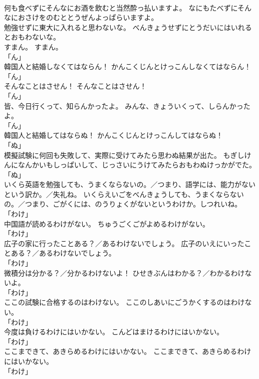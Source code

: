 \documentclass[8pt]{extreport}
\begin{document}
\begin{CJK}{UTF8}{min}
\\	何も食べずにそんなにお酒を飲むと当然酔っ払いますよ。	なにもたべずにそんなにおさけをのむととうぜんよっぱらいますよ。	
\\	勉強せずに東大に入れると思わないな。	べんきょうせずにとうだいにはいれるとおもわないな。	
\\	すまん。	すまん。	
\\	「ん」	
\\	韓国人と結婚しなくてはならん！	かんこくじんとけっこんしなくてはならん！	
\\	「ん」	
\\	そんなことはさせん！	そんなことはさせん！	
\\	「ん」	
\\	皆、今日行くって、知らんかったよ。	みんな、きょういくって、しらんかったよ。	
\\	「ん」	
\\	韓国人と結婚してはならぬ！	かんこくじんとけっこんしてはならぬ！	
\\	「ぬ」	
\\	模擬試験に何回も失敗して、実際に受けてみたら思わぬ結果が出た。	もぎしけんになんかいもしっぱいして、じっさいにうけてみたらおもわぬけっかがでた。	
\\	「ぬ」	
\\	いくら英語を勉強しても、うまくならないの。／つまり、語学には、能力がないという訳か。／失礼ね。	いくらえいごをべんきょうしても、うまくならないの。／つまり、ごがくには、のうりょくがないというわけか。しつれいね。	
\\	「わけ」	
\\	中国語が読めるわけがない。	ちゅうごくごがよめるわけがない。	
\\	「わけ」	
\\	広子の家に行ったことある？／あるわけないでしょう。	広子のいえにいったことある？／あるわけないでしょう。	
\\	「わけ」	
\\	微積分は分かる？／分かるわけないよ！	ひせきぶんはわかる？／わかるわけないよ。	
\\	「わけ」	
\\	ここの試験に合格するのはわけない。	ここのしあいにごうかくするのはわけない。	
\\	「わけ」	
\\	今度は負けるわけにはいかない。	こんどはまけるわけにはいかない。	
\\	「わけ」	
\\	ここまできて、あきらめるわけにはいかない。	ここまできて、あきらめるわけにはいかない。	
\\	「わけ」	

\end{CJK}
\end{document}
